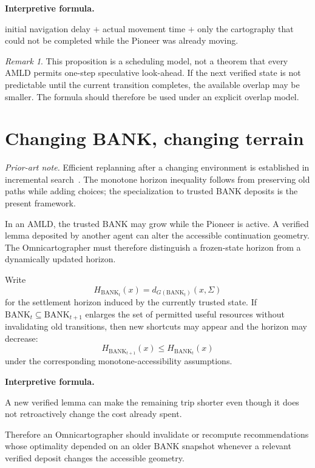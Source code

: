 \documentclass[11pt]{article}
\theoremstyle{definition}
\theoremstyle{remark}
\newtheorem{remark}[theorem]{Remark}
\newcommand{\BANK}{\mathrm{BANK}}
\newcommand{\Sett}{\Sigma}
\newenvironment{interpretiveformula}{%
  \begin{center}\begin{minipage}{0.92\linewidth}\small
  \textbf{Interpretive formula.}\ \raggedright}{\end{minipage}\end{center}}
\begin{document}
\begin{interpretiveformula}
initial navigation delay $+$ actual movement time $+$ only the cartography that could not be completed while the Pioneer was already moving.
\end{interpretiveformula}

\begin{remark}
This proposition is a scheduling model, not a theorem that every AMLD permits one-step speculative look-ahead. If the next verified state is not predictable until the current transition completes, the available overlap may be smaller. The formula should therefore be used under an explicit overlap model.
\end{remark}

\section{Changing BANK, changing terrain}
\noindent\textit{Prior-art note.} Efficient replanning after a changing environment is established in incremental search~\cite{dstar}. The monotone horizon inequality follows from preserving old paths while adding choices; the specialization to trusted BANK deposits is the present framework.

In an AMLD, the trusted $\BANK$ may grow while the Pioneer is active. A verified lemma deposited by another agent can alter the accessible continuation geometry. The Omnicartographer must therefore distinguish a frozen-state horizon from a dynamically updated horizon.

Write
\[
H_{\BANK_t}(x)=d_{G(\BANK_t)}(x,\Sett)
\]
for the settlement horizon induced by the currently trusted state. If $\BANK_t\subseteq\BANK_{t+1}$ enlarges the set of permitted useful resources without invalidating old transitions, then new shortcuts may appear and the horizon may decrease:
\[
H_{\BANK_{t+1}}(x)\le H_{\BANK_t}(x)
\]
under the corresponding monotone-accessibility assumptions.

\begin{interpretiveformula}
A new verified lemma can make the remaining trip shorter even though it does not retroactively change the cost already spent.
\end{interpretiveformula}

Therefore an Omnicartographer should invalidate or recompute recommendations whose optimality depended on an older $\BANK$ snapshot whenever a relevant verified deposit changes the accessible geometry.
\end{document}
